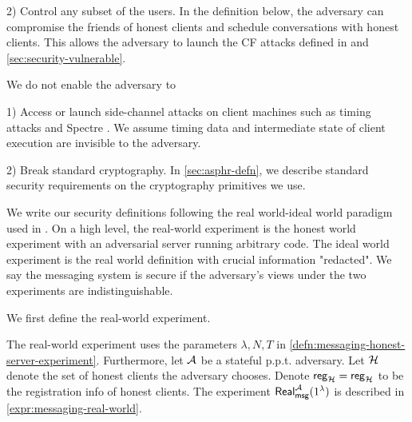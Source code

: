 2) Control any subset of the users. In the definition below, the adversary can compromise the friends of honest clients and schedule conversations with honest clients. This allows the adversary to launch the CF attacks defined in \cite{angel2018cf} and \cref{sec:security-vulnerable}.

We do not enable the adversary to

1) Access or launch side-channel attacks on client machines such as timing attacks and Spectre \cite{Spectre}. We assume timing data and intermediate state of client execution are invisible to the adversary.

2) Break standard cryptography. In \cref{sec:asphr-defn}, we describe standard security requirements on the cryptography primitives we use.

We write our security definitions following the real world-ideal world paradigm used in \cite[Section 2.2]{shi2021non}. On a high level, the real-world experiment is the honest world experiment with an adversarial server running arbitrary code. The ideal world experiment is the real world definition with crucial information "redacted". We say the messaging system is secure if the adversary's views under the two experiments are indistinguishable.

We first define the real-world experiment.

\begin{definition}
\label{defn:messaging-real-world-experiment}
The real-world experiment uses the parameters $\lambda, N, T$ in \cref{defn:messaging-honest-server-experiment}. Furthermore, let $\mathcal{A}$ be a stateful p.p.t. adversary. Let $\mathcal{H}$ denote the set of honest clients the adversary chooses. Denote $\mathsf{reg}_{\mathcal{H}} = \mathsf{reg}_{\mathcal{H}}$ to be the registration info of honest clients. The experiment $\mathsf{Real}_{\mathsf{msg}}^{\mathcal{A}}(1^{\lambda})$ is described in \cref{expr:messaging-real-world}.
\end{definition}

